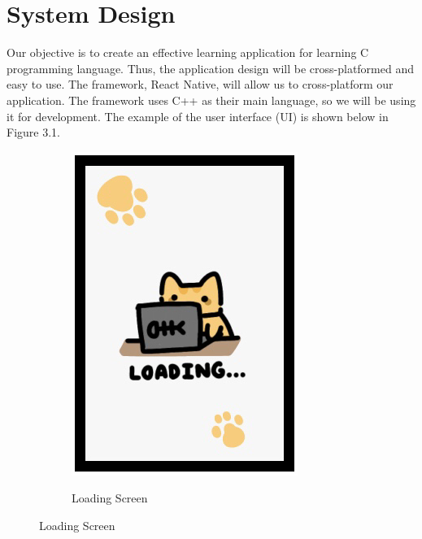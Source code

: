 \section{System Design}
Our objective is to create an effective learning application for learning C programming language. Thus, the application design will be cross-platformed and easy to use. The framework, React Native, will allow us to cross-platform our application. The framework uses C++ as their main language, so we will be using it for development. The example of the user interface (UI) is shown below in Figure 3.1.
    \begin{figure}[!htbp]
    	\centering
    	\begin{subfigure}[b]{0.218\linewidth}
    		\includegraphics[width=\textwidth]{Loading.png}\\
    		\caption{Loading Screen}
    	\end{subfigure}

\end{figure}
